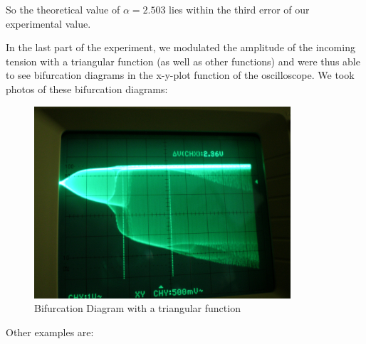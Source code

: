 So the theoretical value of $\alpha = 2.503$ lies within the third error of our experimental value.

In the last part of the experiment, we modulated the amplitude of the incoming tension with a triangular function (as well as other functions) and were thus able to see bifurcation diagrams in the x-y-plot function of the oscilloscope. We took photos of these bifurcation diagrams:

\begin{figure}[H]
\centering \includegraphics[width= 0.85\textwidth]{Fotos2/16.jpg}
\caption{Bifurcation Diagram with a triangular function}
\end{figure}

Other examples are:

